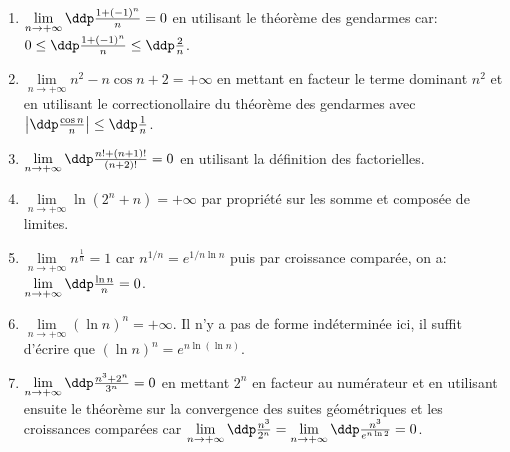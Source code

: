 \begin{correction}
\begin{enumerate}
\item 
$\lim \limits_{n\to +\infty}\ddp\frac{1+(-1)^n}{n}=0$ en utilisant le th\'eor\`eme des gendarmes car: $0\leq \ddp\frac{1+(-1)^n}{n}\leq \ddp\frac{2}{n}$.
\item
$\lim \limits_{n\to +\infty}n^2-n\cos{n}+2=+\infty$ en mettant en facteur le terme dominant $n^2$ et en utilisant le correctionollaire du th\'eor\`eme des gendarmes avec $\left| \ddp\frac{\cos{n}}{n} \right|\leq\ddp\frac{1}{n}$.
\item
$\lim \limits_{n\to +\infty}\ddp\frac{n!+(n+1)!}{(n+2)!}=0$ en utilisant la d\'efinition des factorielles.
\item
$\lim \limits_{n\to +\infty}\ln{(2^n+n)}=+\infty$ par propri\'et\'e sur les somme et compos\'ee de limites.
\item
$\lim \limits_{n\to +\infty}n^{\frac{1}{n}}=1$ car $n^{1/n}=e^{1/n\ln{n}}$ puis par croissance compar\'ee, on a: $\lim\limits_{n\to +\infty} \ddp\frac{\ln{n}}{n}=0$.  
\item
$\lim \limits_{n\to +\infty}(\ln{n})^n=+\infty$. Il n'y a pas de forme ind\'etermin\'ee ici, il suffit d'\'ecrire que $\left( \ln{n}\right)^n=e^{n\ln{(\ln{n})}}$.
\item
$\lim \limits_{n\to +\infty}\ddp\frac{n^3+2^n}{3^n}=0$ en mettant $2^n$ en facteur au num\'erateur et en utilisant ensuite le th\'eor\`eme sur la convergence des suites g\'eom\'etriques et les croissances compar\'ees car $\lim\limits_{n\to +\infty} \ddp\frac{n^3}{2^n}=\lim\limits_{n\to +\infty} \ddp\frac{n^3}{e^{n\ln{2}}}=0$. 

\end{enumerate}
\end{correction}
